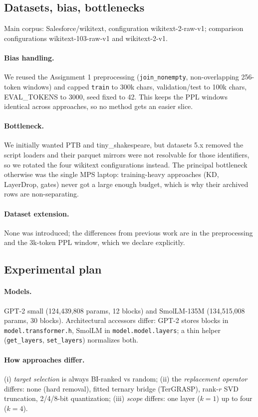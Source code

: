 \documentclass[11pt]{article}
\begin{document}
\subsection{Datasets, bias, bottlenecks}
Main corpus: Salesforce/wikitext, configuration wikitext-2-raw-v1;
comparison configurations wikitext-103-raw-v1 and wikitext-2-v1.
\paragraph{Bias handling.} We reused the Assignment 1 preprocessing
(\texttt{join\_nonempty}, non-overlapping 256-token windows) and capped
\texttt{train} to 300k chars, validation/test to 100k chars, EVAL\_TOKENS
to 3000, seed fixed to 42. This keeps the PPL windows identical across
approaches, so no method gets an easier slice.
\paragraph{Bottleneck.} We initially wanted PTB and tiny\_shakespeare, but
datasets 5.x removed the script loaders and their parquet mirrors were not
resolvable for those identifiers, so we rotated the four wikitext
configurations instead. The principal bottleneck otherwise was the single
MPS laptop: training-heavy approaches (KD, LayerDrop, gates) never got a
large enough budget, which is why their archived rows are non-separating.
\paragraph{Dataset extension.} None was introduced; the differences from
previous work are in the preprocessing and the 3k-token PPL window, which
we declare explicitly.

\subsection{Experimental plan}
\paragraph{Models.} GPT-2 small (124,439,808 params, 12 blocks) and
SmolLM-135M (134,515,008 params, 30 blocks). Architectural accessors
differ: GPT-2 stores blocks in \texttt{model.transformer.h}, SmolLM in
\texttt{model.model.layers}; a thin helper (\texttt{get\_layers},
\texttt{set\_layers}) normalizes both.
\paragraph{How approaches differ.} (i) \emph{target selection} is always
BI-ranked vs random; (ii) the \emph{replacement operator} differs: none
(hard removal), fitted ternary bridge (TerGRASP), rank-$r$ SVD truncation,
2/4/8-bit quantization; (iii) \emph{scope} differs: one layer ($k{=}1$) up
to four ($k{=}4$).
\end{document}
